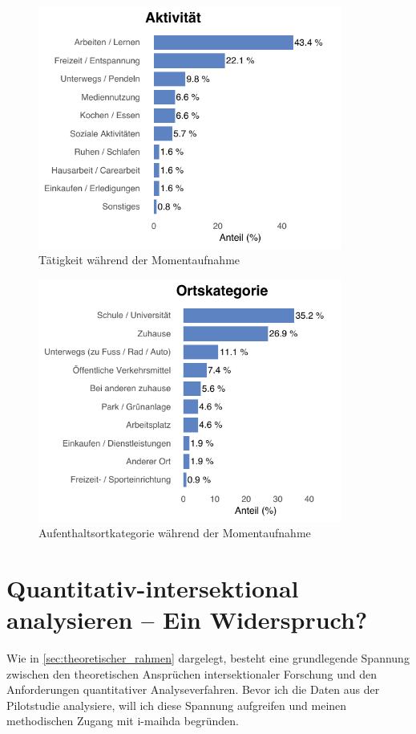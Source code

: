 \begin{figure}[h]
    \centering
    \includegraphics[width=10cm]{Analyse/Plots/cat_dist_activity.pdf}
    \caption{Tätigkeit während der Momentaufnahme}
    \label{fig:survey_activities}
\end{figure}

\begin{figure}[h]
    \centering
    \includegraphics[width=10cm]{Analyse/Plots/cat_dist_location_category.pdf}
    \caption{Aufenthaltsortkategorie während der Momentaufnahme}
    \label{fig:survey_locations}
\end{figure}


\section{Quantitativ-intersektional analysieren -- Ein Widerspruch?}

Wie in \cref{sec:theoretischer_rahmen} dargelegt, besteht eine grundlegende Spannung zwischen den theoretischen Ansprüchen intersektionaler Forschung und den Anforderungen quantitativer Analyseverfahren. Bevor ich die Daten aus der Pilotstudie analysiere, will ich diese Spannung aufgreifen und meinen methodischen Zugang mit \gls{i-maihda} begründen.

